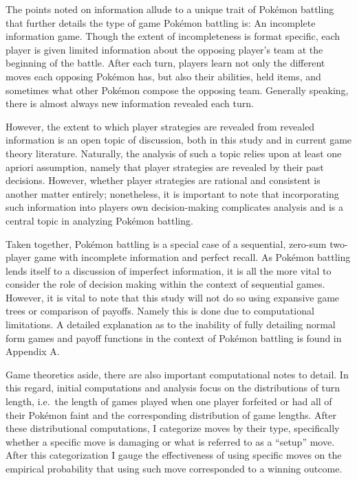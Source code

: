 \documentclass[12pt,twoside]{reedthesis}
\begin{document}
  The points noted on information allude to a unique trait of Pokémon
  battling that further details the type of game Pokémon battling is: An
  incomplete information game. Though the extent of incompleteness is
  format specific, each player is given limited information about the
  opposing player's team at the beginning of the battle. After each turn,
  players learn not only the different moves each opposing Pokémon has,
  but also their abilities, held items, and sometimes what other Pokémon
  compose the opposing team. Generally speaking, there is almost always
  new information revealed each turn.
  
  However, the extent to which player strategies are revealed from
  revealed information is an open topic of discussion, both in this study
  and in current game theory literature. Naturally, the analysis of such a
  topic relies upon at least one apriori assumption, namely that player
  strategies are revealed by their past decisions. However, whether player
  strategies are rational and consistent is another matter entirely;
  nonetheless, it is important to note that incorporating such information
  into players own decision-making complicates analysis and is a central
  topic in analyzing Pokémon battling.
  
  Taken together, Pokémon battling is a special case of a sequential,
  zero-sum two-player game with incomplete information and perfect recall.
  As Pokémon battling lends itself to a discussion of imperfect
  information, it is all the more vital to consider the role of decision
  making within the context of sequential games. However, it is vital to
  note that this study will not do so using expansive game trees or
  comparison of payoffs. Namely this is done due to computational
  limitations. A detailed explanation as to the inability of fully
  detailing normal form games and payoff functions in the context of
  Pokémon battling is found in Appendix A.
  
  Game theoretics aside, there are also important computational notes to
  detail. In this regard, initial computations and analysis focus on the
  distributions of turn length, i.e.~the length of games played when one
  player forfeited or had all of their Pokémon faint and the corresponding
  distribution of game lengths. After these distributional computations, I
  categorize moves by their type, specifically whether a specific move is
  damaging or what is referred to as a ``setup'' move. After this
  categorization I gauge the effectiveness of using specific moves on the
  empirical probability that using such move corresponded to a winning
  outcome.
  
\end{document}
